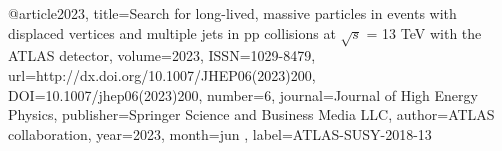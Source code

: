 @article{2023, 
    title={Search for long-lived, 
    massive particles in events with displaced vertices and multiple jets in pp collisions at $ \sqrt{s} $ = 13 TeV with the ATLAS detector}, 
    volume={2023}, 
    ISSN={1029-8479}, 
    url={http://dx.doi.org/10.1007/JHEP06(2023)200}, 
    DOI={10.1007/jhep06(2023)200}, 
    number={6}, 
    journal={Journal of High Energy Physics}, 
    publisher={Springer Science and Business Media LLC}, 
    author={ATLAS collaboration}, 
    year={2023}, 
    month=jun ,
    label={ATLAS-SUSY-2018-13}
}

